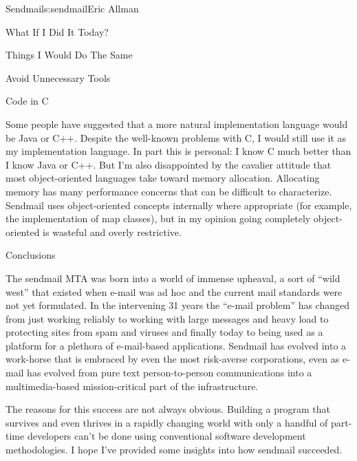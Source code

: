\begin{aosachapter}{Sendmail}{s:sendmail}{Eric Allman}
\begin{aosasect1}{What If I Did It Today?}
\begin{aosasect2}{Things I Would Do The Same}
\begin{aosasect3}{Avoid Unnecessary Tools}
\end{aosasect3}

\begin{aosasect3}{Code in C}

Some people have suggested that a more natural implementation language
would be Java or C++. Despite the well-known problems with C, I would
still use it as my implementation language. In part this is personal:
I know C much better than I know Java or C++. But I'm also
disappointed by the cavalier attitude that most object-oriented
languages take toward memory allocation. Allocating memory has many
performance concerns that can be difficult to characterize.  Sendmail
uses object-oriented concepts internally where appropriate (for
example, the implementation of map classes), but in my opinion going
completely object-oriented is wasteful and overly restrictive.

\end{aosasect3}

\end{aosasect2}

\end{aosasect1}

\begin{aosasect1}{Conclusions}

The sendmail MTA was born into a world of immense upheaval, a sort of
``wild west'' that existed when e-mail was ad hoc and the current mail
standards were not yet formulated.  In the intervening 31 years the
``e-mail problem'' has changed from just working reliably to working
with large messages and heavy load to protecting sites from spam and
viruses and finally today to being used as a platform for a plethora
of e-mail-based applications.  Sendmail has evolved into a work-horse
that is embraced by even the most risk-averse corporations, even as
e-mail has evolved from pure text person-to-person communications into
a multimedia-based mission-critical part of the infrastructure.

The reasons for this success are not always obvious.  Building a
program that survives and even thrives in a rapidly changing world
with only a handful of part-time developers can't be done using
conventional software development methodologies.  I hope I've provided
some insights into how sendmail succeeded.

\end{aosasect1}

\end{aosachapter}
